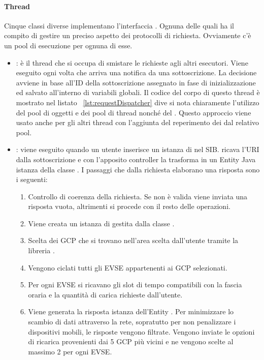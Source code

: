 \paragraph{Thread}\label{par:thread}

Cinque classi diverse implementano l'interfaccia . Ognuna delle quali ha il compito di gestire un preciso aspetto dei protocolli di richiesta. Ovviamente c'è un pool di esecuzione per ognuna di esse.

\begin{itemize}
	\item {}: è il thread che si occupa di smistare le richieste agli altri esecutori. Viene eseguito ogni volta che arriva una notifica da una sottoscrizione. La decisione avviene in base all'ID della sottoscrizione assegnato in fase di inizializzazione ed salvato all'interno di variabili globali. Il codice del corpo di questo thread è mostrato nel listato ~\ref{lst:requestDispatcher} dive si nota chiaramente l'utilizzo del pool di oggetti e dei pool di thread nonché del . Questo approccio viene usato anche per gli altri thread con l'aggiunta del reperimento dei  dal relativo pool.
	\item {}: viene eseguito quando un utente inserisce un istanza di  nel SIB. ricava l'URI dalla sottoscrizione e con l'apposito controller  la trasforma in un Entity Java istanza della classe . I passaggi che dalla richiesta elaborano una risposta sono i seguenti:
	\begin{enumerate}
		\item Controllo di coerenza della richiesta. Se non è valida viene inviata una risposta vuota, altrimenti si procede con il resto delle operazioni.
		\item Viene creata un istanza di  gestita dalla classe .
		\item Scelta dei GCP che si trovano nell'area scelta dall'utente tramite la libreria .
		\item Vengono ciclati tutti gli EVSE appartenenti ai GCP selezionati.
		\item Per ogni EVSE si ricavano gli slot di tempo compatibili con la fascia oraria e la quantità di carica richieste dall'utente.
		\item Viene generata la risposta istanza dell'Entity . Per minimizzare lo scambio di dati attraverso la rete, sopratutto per non penalizzare i dispositivi mobili, le risposte vengono filtrate. Vengono inviate le opzioni di ricarica provenienti dai 5 GCP più vicini e ne vengono scelte al massimo 2 per ogni EVSE.

\end{enumerate}
\end{itemize}
